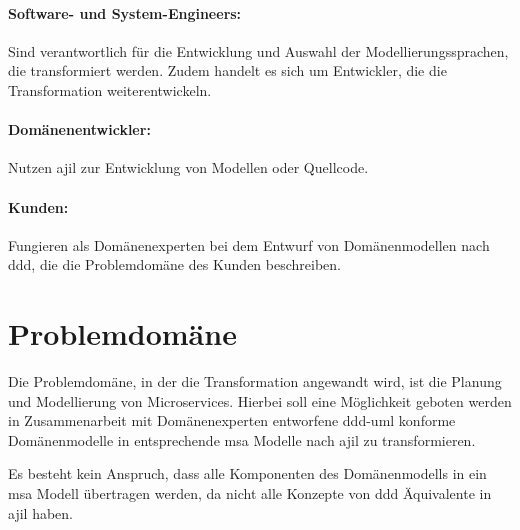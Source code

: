 \documentclass[
	oneside,  %
	ngerman, 
	final, 
	11pt, 
	a4paper, 
	1.1headlines, 
	headinclude=false, 
	footinclude=false, 
	mpinclude=false, 
	pagesize, 
	onecolumn, 
	titlepage, 
	parskip=half, 
	headsepline, 
	chapterprefix=false, 
	version=first, 
	listof=totoc, 
	bibliography=totoc, 
	toc=graduated, 
	fleqn
]{scrbook}
\begin{document}
\paragraph{Software- und System-Engineers:} Sind verantwortlich für die Entwicklung und Auswahl der Modellierungssprachen, die transformiert werden. Zudem handelt es sich um Entwickler, die die Transformation weiterentwickeln.
\paragraph{Domänenentwickler:} Nutzen \ac{ajil} zur Entwicklung von Modellen oder Quellcode.
\paragraph{Kunden:} Fungieren als Domänenexperten bei dem Entwurf von Domänenmodellen nach \ac{ddd}, die die Problemdomäne des Kunden beschreiben.
\section{Problemdomäne}
Die Problemdomäne, in der die Transformation angewandt wird, ist die Planung und Modellierung von Microservices. Hierbei soll eine Möglichkeit geboten werden in Zusammenarbeit mit Domänenexperten entworfene \ac{ddd}-\ac{uml} konforme Domänenmodelle in entsprechende \ac{msa} Modelle nach \ac{ajil} zu transformieren.

Es besteht kein Anspruch, dass alle Komponenten des Domänenmodells in ein \ac{msa} Modell übertragen werden, da nicht alle Konzepte von \ac{ddd} Äquivalente in \ac{ajil} haben.
\end{document}
